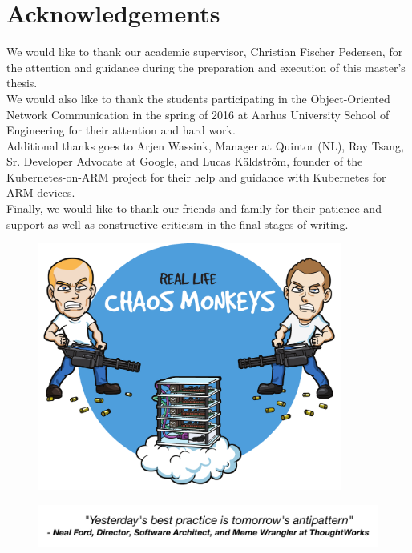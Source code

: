 

\chapter{Acknowledgements}

We would like to thank our academic supervisor, Christian Fischer Pedersen, for the attention and guidance during the preparation and execution of this master's thesis. \\

\noindent
We would also like to thank the students participating in the Object-Oriented Network Communication in the spring of 2016 at Aarhus University School of Engineering for their attention and hard work.\\

\noindent
Additional thanks goes to Arjen Wassink, Manager at Quintor (NL), Ray Tsang, Sr. Developer Advocate at Google, and Lucas Käldström, founder of the Kubernetes-on-ARM project for their help and guidance with Kubernetes for ARM-devices.\\

\noindent
Finally, we would like to thank our friends and family for their patience and support as well as constructive criticism in the final stages of writing.
 

\begin{figure}[H]
\vspace*{3cm}
    \centering
    \includegraphics[width=10cm]{figures/logo_chaos_monkeys}
 \end{figure}


\begin{figure}
	\centering
	\includegraphics[width=12cm]{figures/quote_antipattern}
\end{figure}